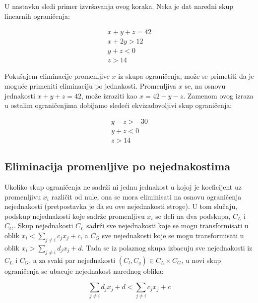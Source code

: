 \documentclass[a4paper,10pt]{article}
\begin{document}
U nastavku sledi primer izvršavanja ovog koraka. Neka je dat naredni skup linearnih ograničenja:

\begin{equation}
\begin{gathered}
    \label{eq:example_s_1}
    x + y + z = 42 \\
    x + 2y > 12 \\
    y + z < 0 \\
    z > 14
\end{gathered}
\end{equation}

Pokušajem eliminacije promenljive $x$ iz skupa ograničenja, može se primetiti da je moguće primeniti eliminaciju po jednakosti. Promenljiva $x$ se, na osnovu jednakosti $x + y + z = 42$, može izraziti kao $x = 42 - y - z$. Zamenom ovog izraza u ostalim ograničenjima dobijamo sledeći ekvizadovoljivi skup ograničenja:


\begin{equation}
\begin{gathered}
    \label{eq:example_s_2}
    y - z > -30 \\
    y + z < 0 \\
    z > 14
\end{gathered}
\end{equation}

\subsection{Eliminacija promenljive po nejednakostima}

Ukoliko skup ograničenja ne sadrži ni jednu jednakost u kojoj je koeficijent uz promenljivu $x_i$ različit od nule, ona se mora eliminisati na osnovu ograničenja nejednakosti (pretpostavka je da su ove nejednakosti stroge). U tom slučaju, podskup nejednakosti koje sadrže promenljivu $x_i$ se deli na dva podskupa, $C_L$ i $C_G$. Skup nejednakosti $C_L$ sadrži sve nejednakosti koje se mogu transformisati u oblik $x_i < \sum_{j \ne i}{c_jx_j + c}$, a $C_G$ sve nejednakosti koje se mogu transformisati u oblik $x_i > \sum_{j \ne i}{d_jx_j + d}$. Tada se iz polaznog skupa izbacuju sve nejednakosti iz $C_L$ i $C_G$, a za svaki par nejednakosti $(C_l, C_g) \in C_L \times C_G$, u novi skup ograničenja se ubacuje nejednakost narednog oblika:

\begin{equation}
    \label{eq:new_ineq}
    \sum_{j \ne i}{d_jx_j + d} < \sum_{j \ne i}{c_jx_j + c}
\end{equation}
\end{document}
